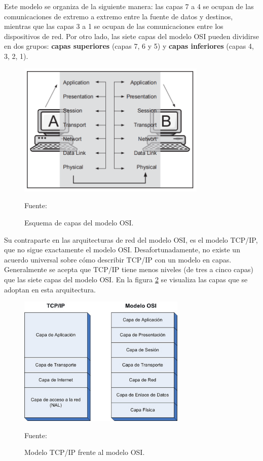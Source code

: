 Este modelo se organiza de la siguiente manera: las capas 7 a 4 se ocupan de las comunicaciones de extremo a extremo entre la fuente de datos y destinos, mientras que las capas 3 a 1 se ocupan de las comunicaciones entre los dispositivos de red. Por otro lado, las siete capas del modelo OSI pueden dividirse en dos grupos: \textbf{capas superiores} (capas 7, 6 y 5) y \textbf{capas inferiores} (capas 4, 3, 2, 1).\\

\begin{figure}[H]
    \begin{center}
        \includegraphics[width=9cm]{img/capitulo_2/capas.png}
        \caption{Esquema de capas del modelo OSI.\\}
        Fuente: \protect\cite[3]{networkProtocolos:handbook}
        \label{fig:osi}
    \end{center}
\end{figure}

Su contraparte en las arquitecturas de red del modelo OSI, es el modelo TCP/IP, que no sigue exactamente el modelo OSI. Desafortunadamente, no existe un acuerdo universal sobre cómo describir TCP/IP con un modelo en capas. Generalmente se acepta que TCP/IP tiene menos niveles (de tres a cinco capas) que las siete capas del modelo OSI. En la figura \ref{fig:tcpip} se visualiza las capas que se adoptan en esta arquitectura. 

\begin{figure}[H]
    \centering
    \includegraphics[width=8cm]{img/capitulo_2/tcp_ip_osi.jpg}\\
    \medskip
    \caption{Modelo TCP/IP frente al modelo OSI.\\}
    Fuente: \cite{tcpiposi}
    \label{fig:tcpip}
\end{figure}

